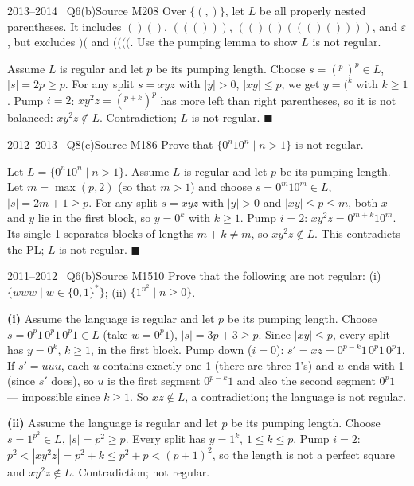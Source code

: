 \documentclass[11pt,a4paper]{article}
\newcommand{\eps}{\varepsilon}
\begin{document}
\begin{question}{2013--2014 \textbullet\ Q6(b)}{Source M20}{8}
Over $\{(,)\}$, let $L$ be all properly nested parentheses. It includes $()()$, $((()))$, $(()()((()())))$, and $\eps$, but excludes $)($ and $(((($. Use the pumping lemma to show $L$ is not regular.
\end{question}
\begin{solution}
Assume $L$ is regular and let $p$ be its pumping length. Choose $s=(^p\,)^p\in L$, $|s|=2p\ge p$. For any split $s=xyz$ with $|y|>0$, $|xy|\le p$, we get $y=(^k$ with $k\ge1$. Pump $i=2$: $xy^2z=(^{p+k})^p$ has more left than right parentheses, so it is not balanced: $xy^2z\notin L$. Contradiction; $L$ is not regular. \hfill$\blacksquare$
\end{solution}

\begin{question}{2012--2013 \textbullet\ Q8(c)}{Source M18}{6}
Prove that $\{0^n10^n\mid n>1\}$ is not regular.
\end{question}
\begin{solution}
Let $L=\{0^n10^n\mid n>1\}$. Assume $L$ is regular and let $p$ be its pumping length. Let $m=\max(p,2)$ (so that $m>1$) and choose $s=0^m10^m\in L$, $|s|=2m+1\ge p$. For any split $s=xyz$ with $|y|>0$ and $|xy|\le p\le m$, both $x$ and $y$ lie in the first block, so $y=0^k$ with $k\ge1$. Pump $i=2$: $xy^2z=0^{m+k}10^m$. Its single 1 separates blocks of lengths $m+k\neq m$, so $xy^2z\notin L$. This contradicts the PL; $L$ is not regular. \hfill$\blacksquare$
\end{solution}

\begin{question}{2011--2012 \textbullet\ Q6(b)}{Source M15}{10}
Prove that the following are not regular: (i) $\{www\mid w\in\{0,1\}^*\}$; (ii) $\{1^{n^2}\mid n\ge0\}$.
\end{question}
\begin{solution}
\textbf{(i)} Assume the language is regular and let $p$ be its pumping length. Choose $s=0^p1\,0^p1\,0^p1\in L$ (take $w=0^p1$), $|s|=3p+3\ge p$. Since $|xy|\le p$, every split has $y=0^k$, $k\ge1$, in the first block. Pump down ($i=0$): $s'=xz=0^{p-k}1\,0^p1\,0^p1$. If $s'=uuu$, each $u$ contains exactly one 1 (there are three 1's) and $u$ ends with 1 (since $s'$ does), so $u$ is the first segment $0^{p-k}1$ and also the second segment $0^p1$ --- impossible since $k\ge1$. So $xz\notin L$, a contradiction; the language is not regular.

\textbf{(ii)} Assume the language is regular and let $p$ be its pumping length. Choose $s=1^{p^2}\in L$, $|s|=p^2\ge p$. Every split has $y=1^k$, $1\le k\le p$. Pump $i=2$: $p^2<|xy^2z|=p^2+k\le p^2+p<(p+1)^2$, so the length is not a perfect square and $xy^2z\notin L$. Contradiction; not regular.
\end{solution}
\end{document}
